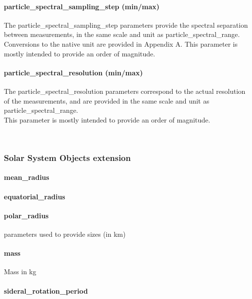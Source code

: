 \documentclass[11pt,a4paper]{ivoa}
\begin{document}
\paragraph{particle\_spectral\_sampling\_step (min/max)}

The particle\_spectral\_sampling\_step parameters provide the spectral separation between measurements, in the same scale and unit as particle\_spectral\_range.\\ Conversions to the native unit are provided in Appendix A. This parameter is mostly intended to provide an order of magnitude.

\paragraph{particle\_spectral\_resolution (min/max)}

The particle\_spectral\_resolution parameters correspond to the actual resolution of the measurements, and are provided in the same scale and unit as particle\_spectral\_range. \\ This parameter is mostly intended to provide an order of magnitude.

 

\subsubsection{Solar System Objects extension\\}

\paragraph{mean\_radius}

\paragraph{equatorial\_radius}

\paragraph{polar\_radius}

parameters used to provide sizes (in km)

\paragraph{mass}

Mass in kg

\paragraph{sideral\_rotation\_period}
\end{document}
